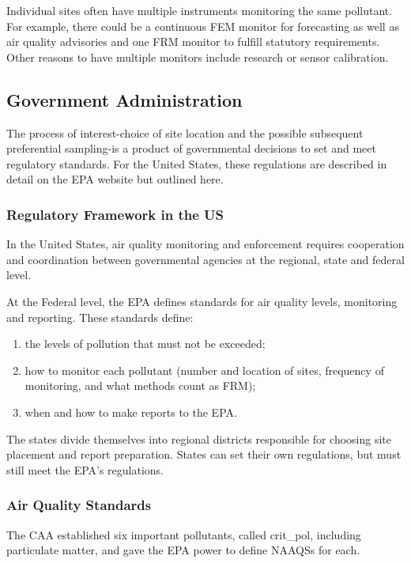 \documentclass{article}
\begin{document}
Individual sites often have multiple instruments monitoring the same pollutant. For example, there could be a continuous \ac{FEM} monitor for forecasting as well as air quality advisories and one \ac{FRM} monitor to fulfill statutory requirements.  Other reasons to have multiple monitors include research or sensor calibration. 



\subsection{Government Administration}
\label{subsec:govtadmin}
The process of interest-choice of site location and the possible subsequent preferential sampling-is a product of governmental decisions to set and meet regulatory standards.  For the United States, these regulations are described in detail on the EPA website
but outlined here.

\subsubsection*{Regulatory Framework in the US}
\label{subsubsec:regulation}
In the United States, air quality monitoring and enforcement requires cooperation and coordination between governmental agencies at the regional, state and federal level.

At the Federal level, the \ac{EPA} defines standards for air quality levels, monitoring and reporting.   These standards define:
\begin{enumerate}
    \item the levels of pollution that must not be exceeded;
    \item how to monitor each pollutant (number and location of sites, frequency of monitoring, and what methods count as \ac{FRM});
    \item when and how to make reports to the \ac{EPA}.
\end{enumerate}

The states divide themselves into regional districts responsible for choosing site placement and report preparation.  States can set their own regulations, but must still meet the \ac{EPA}'s regulations. 

\subsubsection*{Air Quality Standards}\label{subsubsec:aqs}
The \ac{CAA} established six important pollutants, called \gls{crit_pol}, 
including particulate matter, and gave the \ac{EPA} power to define \acp{NAAQS} for each.
\end{document}
